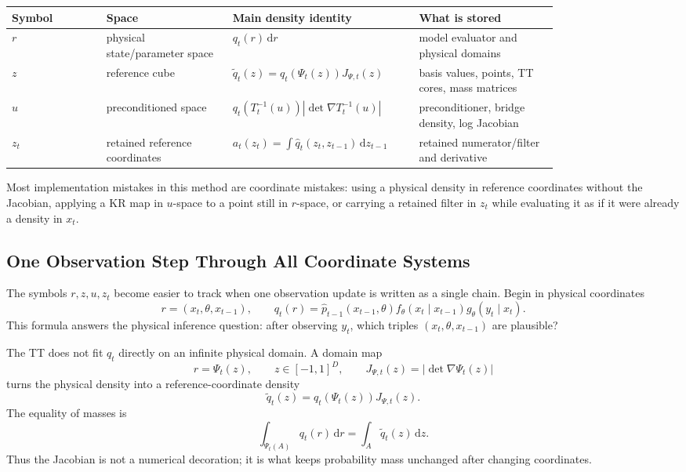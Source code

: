 \documentclass[11pt]{article}
\numberwithin{equation}{section}
\newcommand{\dd}{\,\mathrm d}
\begin{document}
\begin{center}
\begin{tabular}{p{0.15\linewidth}p{0.20\linewidth}p{0.24\linewidth}p{0.22\linewidth}}
\toprule
Symbol & Space & Main density identity & What is stored\\
\midrule
\(r\) & physical state/parameter space &
\(q_t(r)\dd r\) &
model evaluator and physical domains\\
\(z\) & reference cube &
\(\widetilde q_t(z)=q_t(\Psi_t(z))J_{\Psi,t}(z)\) &
basis values, points, TT cores, mass matrices\\
\(u\) & preconditioned space &
\(q_t(T_t^{-1}(u))|\det\nabla T_t^{-1}(u)|\) &
preconditioner, bridge density, log Jacobian\\
\(z_t\) & retained reference coordinates &
\(a_t(z_t)=\int\widehat q_t(z_t,z_{t-1})\dd z_{t-1}\) &
retained numerator/filter and derivative\\
\bottomrule
\end{tabular}
\end{center}

Most implementation mistakes in this method are coordinate mistakes: using a
physical density in reference coordinates without the Jacobian, applying a KR
map in \(u\)-space to a point still in \(r\)-space, or carrying a retained
filter in \(z_t\) while evaluating it as if it were already a density in
\(x_t\).

\subsection{One Observation Step Through All Coordinate Systems}

The symbols \(r,z,u,z_t\) become easier to track when one observation update is
written as a single chain.  Begin in physical coordinates
\begin{equation}
    r=(x_t,\theta,x_{t-1}),
    \qquad
    q_t(r)
    =
    \widehat p_{t-1}(x_{t-1},\theta)
    f_\theta(x_t\mid x_{t-1})
    g_\theta(y_t\mid x_t).
    \label{eq:p25-walk-1}
\end{equation}
This formula answers the physical inference question: after observing \(y_t\),
which triples \((x_t,\theta,x_{t-1})\) are plausible?

The TT does not fit \(q_t\) directly on an infinite physical domain.  A domain
map
\begin{equation}
    r=\Psi_t(z),
    \qquad
    z\in[-1,1]^D,
    \qquad
    J_{\Psi,t}(z)=|\det\nabla\Psi_t(z)|
    \label{eq:p25-walk-2}
\end{equation}
turns the physical density into a reference-coordinate density
\begin{equation}
    \widetilde q_t(z)
    =
    q_t(\Psi_t(z))J_{\Psi,t}(z).
    \label{eq:p25-walk-3}
\end{equation}
The equality of masses is
\begin{equation}
    \int_{\Psi_t(A)} q_t(r)\dd r
    =
    \int_A \widetilde q_t(z)\dd z.
    \label{eq:p25-walk-4}
\end{equation}
Thus the Jacobian is not a numerical decoration; it is what keeps probability
mass unchanged after changing coordinates.
\end{document}
